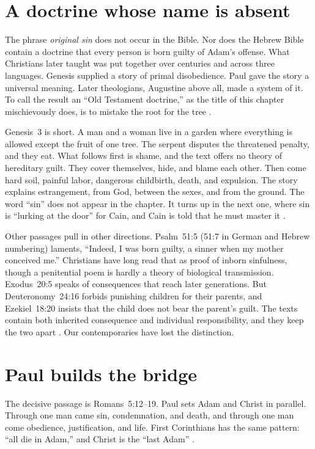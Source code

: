 \documentclass[12pt,a4paper]{book}
\begin{document}
\section{A doctrine whose name is absent}

The phrase \emph{original sin} does not occur in the Bible. Nor does the Hebrew Bible contain a doctrine that every person is born guilty of Adam's offense. What Christians later taught was put together over centuries and across three languages. Genesis supplied a story of primal disobedience. Paul gave the story a universal meaning. Later theologians, Augustine above all, made a system of it. To call the result an ``Old Testament doctrine,'' as the title of this chapter mischievously does, is to mistake the root for the tree \cite{NRSVue2021,TimpeChristianSin2021,BeatriceTransmissionSin2013}.

Genesis~3 is short. A man and a woman live in a garden where everything is allowed except the fruit of one tree. The serpent disputes the threatened penalty, and they eat. What follows first is shame, and the text offers no theory of hereditary guilt. They cover themselves, hide, and blame each other. Then come hard soil, painful labor, dangerous childbirth, death, and expulsion. The story explains estrangement, from God, between the sexes, and from the ground. The word ``sin'' does not appear in the chapter. It turns up in the next one, where sin is ``lurking at the door'' for Cain, and Cain is told that he must master it \cite[Gen.~3; 4:7]{NRSVue2021}.

Other passages pull in other directions. Psalm~51:5 (51:7 in German and Hebrew numbering) laments, ``Indeed, I was born guilty, a sinner when my mother conceived me.'' Christians have long read that as proof of inborn sinfulness, though a penitential poem is hardly a theory of biological transmission. Exodus~20:5 speaks of consequences that reach later generations. But Deuteronomy~24:16 forbids punishing children for their parents, and Ezekiel~18:20 insists that the child does not bear the parent's guilt. The texts contain both inherited consequence and individual responsibility, and they keep the two apart \cite{NRSVue2021}. Our contemporaries have lost the distinction.

\section{Paul builds the bridge}

The decisive passage is Romans~5:12--19. Paul sets Adam and Christ in parallel. Through one man came sin, condemnation, and death, and through one man come obedience, justification, and life. First Corinthians has the same pattern: ``all die in Adam,'' and Christ is the ``last Adam'' \cite[Rom.~5:12--19; 1~Cor.~15:21--22, 45]{NRSVue2021}.
\end{document}
